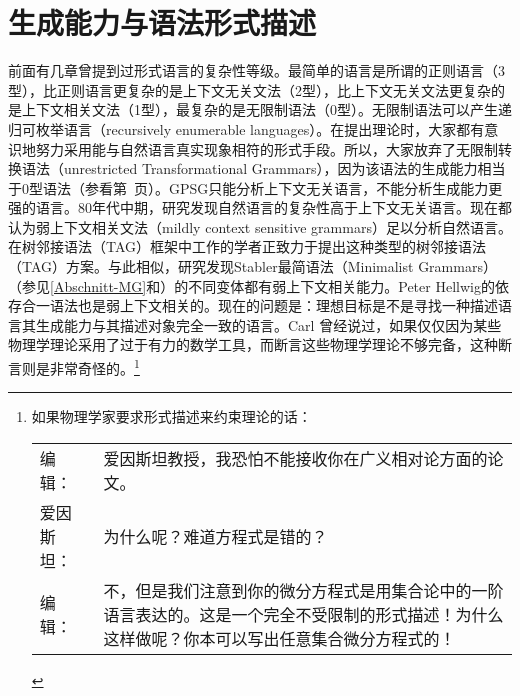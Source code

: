 
\chapter{生成能力与语法形式描述}
\label{sec-generative-capacity}

前面有几章曾提到过形式语言的复杂性等级。最简单的语言是所谓的正则语言（3型），比正则语言更复杂的是上下文无关文法（2型），比上下文无关文法更复杂的是上下文相关文法（1型），最复杂的是无限制语法（0型）。无限制语法可以产生递归可枚举语言（recursively enumerable languages）。在提出理论时，大家都有意识地努力采用能与自然语言真实现象相符的形式手段。所以，大家放弃了无限制转换语法（unrestricted Transformational Grammars），因为该语法的生成能力相当于0型语法（参看第~\pageref{page-TG-Typ0}页）。GPSG只能分析上下文无关语言，不能分析生成能力更强的语言。80年代中期，研究发现自然语言的复杂性高于上下文无关语言\citep{Shieber85a,Culy85a}。现在都认为弱上下文相关文法（mildly context sensitive grammars）足以分析自然语言。在树邻接语法\indextag （TAG）框架中工作的学者正致力于提出这种类型的树邻接语法\indextagc （TAG）方案。与此相似，研究发现Stabler最简语法（Minimalist Grammars）\indexmgc （参见\ref{Abschnitt-MG}和\citealp{Stabler2001a,Stabler2010b}）的不同变体都有弱上下文相关能力\citep{Michaelis2001a-u}。Peter Hellwig的依存合一语法也是弱上下文相关的\citep[]{Hellwig2003a}。现在的问题是：理想目标是不是寻找一种描述语言其生成能力与其描述对象完全一致的语言。Carl  \citet{Pollard96a}曾经说过，如果仅仅因为某些物理学理论采用了过于有力的数学工具，而断言这些物理学理论不够完备，这种断言则是非常奇怪的。\footnote{%
如果物理学家要求形式描述来约束理论的话：\\
\begin{tabular}{@{}l@{~}p{10.8cm}}
编辑：     & 爱因斯坦教授，我恐怕不能接收你在广义相对论方面的论文。\\
爱因斯坦： & 为什么呢？难道方程式是错的？\\
编辑：     & 不，但是我们注意到你的微分方程式是用集合论中的一阶语言表达的。这是一个完全不受限制的形式描述！为什么这样做呢？你本可以写出任意集合微分方程式的！ \citep{Pollard96a}
\end{tabular}
}
